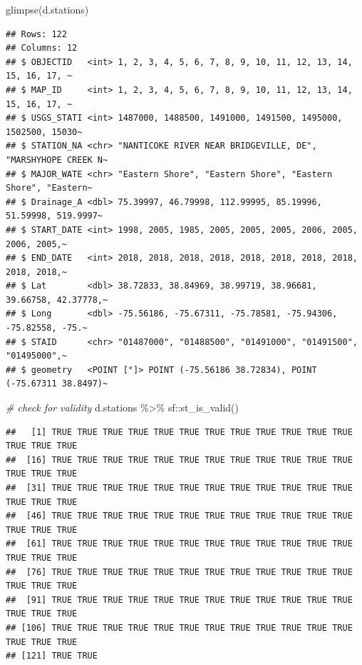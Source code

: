 \documentclass[]{article}
\newenvironment{Shaded}{\begin{snugshade}}{\end{snugshade}}
\newcommand{\CommentTok}[1]{\textcolor[rgb]{0.56,0.35,0.01}{\textit{#1}}}
\newcommand{\FunctionTok}[1]{\textcolor[rgb]{0.00,0.00,0.00}{#1}}
\newcommand{\NormalTok}[1]{#1}
\newcommand{\SpecialCharTok}[1]{\textcolor[rgb]{0.00,0.00,0.00}{#1}}
\begin{document}
\begin{Shaded}
\begin{Highlighting}[]
\FunctionTok{glimpse}\NormalTok{(d.stations)}
\end{Highlighting}
\end{Shaded}

\begin{verbatim}
## Rows: 122
## Columns: 12
## $ OBJECTID   <int> 1, 2, 3, 4, 5, 6, 7, 8, 9, 10, 11, 12, 13, 14, 15, 16, 17, ~
## $ MAP_ID     <int> 1, 2, 3, 4, 5, 6, 7, 8, 9, 10, 11, 12, 13, 14, 15, 16, 17, ~
## $ USGS_STATI <int> 1487000, 1488500, 1491000, 1491500, 1495000, 1502500, 15030~
## $ STATION_NA <chr> "NANTICOKE RIVER NEAR BRIDGEVILLE, DE", "MARSHYHOPE CREEK N~
## $ MAJOR_WATE <chr> "Eastern Shore", "Eastern Shore", "Eastern Shore", "Eastern~
## $ Drainage_A <dbl> 75.39997, 46.79998, 112.99995, 85.19996, 51.59998, 519.9997~
## $ START_DATE <int> 1998, 2005, 1985, 2005, 2005, 2005, 2006, 2005, 2006, 2005,~
## $ END_DATE   <int> 2018, 2018, 2018, 2018, 2018, 2018, 2018, 2018, 2018, 2018,~
## $ Lat        <dbl> 38.72833, 38.84969, 38.99719, 38.96681, 39.66758, 42.37778,~
## $ Long       <dbl> -75.56186, -75.67311, -75.78581, -75.94306, -75.82558, -75.~
## $ STAID      <chr> "01487000", "01488500", "01491000", "01491500", "01495000",~
## $ geometry   <POINT [°]> POINT (-75.56186 38.72834), POINT (-75.67311 38.8497)~
\end{verbatim}

\begin{Shaded}
\begin{Highlighting}[]
\CommentTok{\# check for validity}
\NormalTok{d.stations }\SpecialCharTok{\%\textgreater{}\%}\NormalTok{ sf}\SpecialCharTok{::}\FunctionTok{st\_is\_valid}\NormalTok{()}
\end{Highlighting}
\end{Shaded}

\begin{verbatim}
##   [1] TRUE TRUE TRUE TRUE TRUE TRUE TRUE TRUE TRUE TRUE TRUE TRUE TRUE TRUE TRUE
##  [16] TRUE TRUE TRUE TRUE TRUE TRUE TRUE TRUE TRUE TRUE TRUE TRUE TRUE TRUE TRUE
##  [31] TRUE TRUE TRUE TRUE TRUE TRUE TRUE TRUE TRUE TRUE TRUE TRUE TRUE TRUE TRUE
##  [46] TRUE TRUE TRUE TRUE TRUE TRUE TRUE TRUE TRUE TRUE TRUE TRUE TRUE TRUE TRUE
##  [61] TRUE TRUE TRUE TRUE TRUE TRUE TRUE TRUE TRUE TRUE TRUE TRUE TRUE TRUE TRUE
##  [76] TRUE TRUE TRUE TRUE TRUE TRUE TRUE TRUE TRUE TRUE TRUE TRUE TRUE TRUE TRUE
##  [91] TRUE TRUE TRUE TRUE TRUE TRUE TRUE TRUE TRUE TRUE TRUE TRUE TRUE TRUE TRUE
## [106] TRUE TRUE TRUE TRUE TRUE TRUE TRUE TRUE TRUE TRUE TRUE TRUE TRUE TRUE TRUE
## [121] TRUE TRUE
\end{verbatim}
\end{document}
